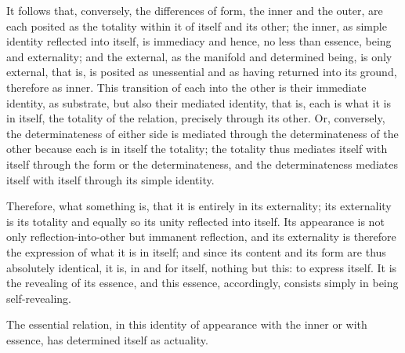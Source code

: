 It follows that, conversely, the differences of form,
the inner and the outer, are each posited
as the totality within it of itself and its other;
the inner, as simple identity reflected into itself, is immediacy
and hence, no less than essence, being and externality;
and the external, as the manifold and determined being, is only external,
that is, is posited as unessential
and as having returned into its ground, therefore as inner.
This transition of each into the other is their immediate identity, as substrate,
but also their mediated identity, that is, each is what it is in itself,
the totality of the relation, precisely through its other.
Or, conversely, the determinateness of either side is mediated
through the determinateness of the other
because each is in itself the totality;
the totality thus mediates itself with itself
through the form or the determinateness,
and the determinateness mediates
itself with itself through its simple identity.

Therefore, what something is, that it is entirely in its externality;
its externality is its totality and equally so its unity reflected into itself.
Its appearance is not only reflection-into-other but immanent reflection,
and its externality is therefore the expression of what it is in itself;
and since its content and its form are thus absolutely identical,
it is, in and for itself, nothing but this: to express itself.
It is the revealing of its essence, and this essence,
accordingly, consists simply in being self-revealing.

The essential relation, in this identity
of appearance with the inner or with essence,
has determined itself as actuality.
